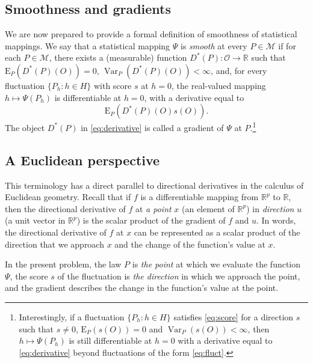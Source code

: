 \documentclass[11pt,openright,twoside]{book}
\DeclareMathOperator{\Var}{Var}
\newcommand{\bbR}{\mathbb{R}}
\newcommand{\calM}{\mathcal{M}}
\newcommand{\calO}{\mathcal{O}}
\newcommand{\Exp}{\textrm{E}}
\theoremstyle{definition}
\theoremstyle{definition}
\theoremstyle{definition}
\theoremstyle{remark}
\begin{document}
\hypertarget{smoothness-and-gradients}{%
\subsection{Smoothness and gradients}\label{smoothness-and-gradients}}

We are now prepared to provide a formal definition of smoothness of
statistical mappings. We say that a statistical mapping \(\Psi\) is \emph{smooth} at
every \(P \in \calM\) if for each \(P \in \calM\), there exists a (measurable)
function \(D^{*}(P) : \calO \to \bbR\) such that \(\Exp_{P}(D^{*}(P)(O)) = 0\),
\(\Var_{P}(D^{*}(P)(O)) < \infty\), and, for every fluctuation \(\{P_{h} : h \in H\}\) with score \(s\) at \(h = 0\), the real-valued mapping \(h \mapsto \Psi(P_{h})\) is differentiable at \(h=0\), with a derivative equal to
\begin{equation} 
\Exp_{P} \left( D^{*}(P)(O) s(O) \right).  \label{eq:derivative} 
\end{equation}
The object \(D^*(P)\) in \eqref{eq:derivative} is called a
gradient of \(\Psi\) at \(P\).\footnote{Interestingly, if a fluctuation \(\{P_{h} : h \in H\}\) satisfies \eqref{eq:score} for a direction \(s\) such that \(s\neq 0\),
  \(\Exp_{P}(s(O)) = 0\) and \(\Var_{P} (s(O)) < \infty\), then \(h \mapsto \Psi(P_{h})\) is still differentiable at \(h=0\) with a derivative equal to
  \eqref{eq:derivative} beyond fluctuations of the form \eqref{eq:fluct}.}

\hypertarget{Euclidean-perspective}{%
\subsection{A Euclidean perspective}\label{Euclidean-perspective}}

This terminology has a direct parallel to directional derivatives in the
calculus of Euclidean geometry. Recall that if \(f\) is a differentiable
mapping from \(\bbR^p\) to \(\bbR\), then the directional derivative of \(f\) at \emph{a
point} \(x\) (an element of \(\bbR^p\)) in \emph{direction} \(u\) (a unit vector in
\(\bbR^p\)) is the scalar product of the gradient of \(f\) and \(u\). In words, the
directional derivative of \(f\) at \(x\) can be represented as a scalar product of
the direction that we approach \(x\) and the change of the function's value at
\(x\).

In the present problem, the law \(P\) is \emph{the point} at which we evaluate the
function \(\Psi\), the score \(s\) of the fluctuation is \emph{the direction} in which
we approach the point, and the gradient describes the change in the function's
value at the point.
\end{document}

